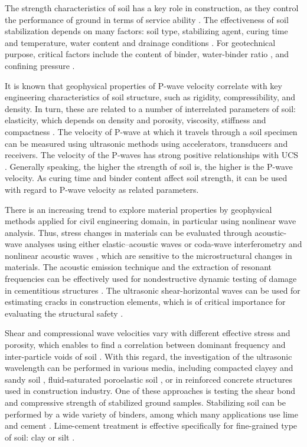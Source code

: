 \documentclass[USenglish,twocolumn]{article}
\begin{document}
The strength characteristics of soil has a key role in construction, as they control the performance of ground in terms of service ability \cite{Munfakh}. The effectiveness of soil stabilization depends on many factors: soil type, stabilizing agent, curing time and temperature, water content and drainage conditions \cite{Winterkorn1991b}. For geotechnical purpose, critical factors include the content of binder, water-binder ratio \cite{Robertson,Zhang,Yangetal2010}, and confining pressure \cite{Rabbi,Xuetal2022,Huangetal2022}. 

It is known that geophysical properties of P-wave velocity correlate with key engineering characteristics of soil structure, such as rigidity, compressibility, and density. In turn, these are related to a number of interrelated parameters of soil: elasticity, which depends on density and porosity, viscosity, stiffness and compactness \cite{askeland2008essentials,askeland2005science}. The velocity of P-wave at which it travels through a soil specimen can be measured using ultrasonic methods using accelerators, transducers and receivers. The velocity of the P-waves has strong positive relationships with UCS \cite{Sarno,Pellet}. Generally speaking, the higher the strength of soil is, the higher is the P-wave velocity. As curing time and binder content affect soil strength, it can be used with regard to P-wave velocity as related parameters. 

There is an increasing trend to explore material properties by geophysical methods applied for civil engineering domain, in particular using nonlinear wave analysis. Thus, stress changes in materials can be evaluated through acoustic-wave analyses using either elastic–acoustic waves  \cite{Jiangetal2017} or coda-wave interferometry and nonlinear acoustic waves \cite{Jiangetal2021}, which are sensitive to the microstructural changes in materials. The acoustic emission technique and the extraction of resonant frequencies can be effectively used for nondestructive dynamic testing of damage in cementitious structures \cite{Lacidogna}. The ultrasonic shear-horizontal waves can be used for estimating cracks in construction elements, which is of critical importance for evaluating the structural safety \cite{LinWang}.

Shear and compressional wave velocities vary with different effective stress and porosity, which enables to find a correlation between dominant frequency and inter-particle voids of soil \cite{Gheibi}. With this regard, the investigation of the ultrasonic wavelength can be performed in various media, including compacted clayey and sandy soil \cite{Sarroetal2021}, fluid-saturated poroelastic soil \cite{Shietal2017}, or in reinforced concrete structures \cite{Carpinteri,Aggelis} used in construction industry. One of these approaches is testing the shear bond and compressive strength of stabilized ground samples. Stabilizing soil can be performed by a wide variety of binders, among which many applications use lime \cite{DiSanteetal2020} and cement \cite{Lemenkova202222}. Lime-cement treatment is effective specifically for fine-grained type of soil: clay or silt \cite{Brice,Heath,Addison,Rogers,Solanki}.  
\end{document}
